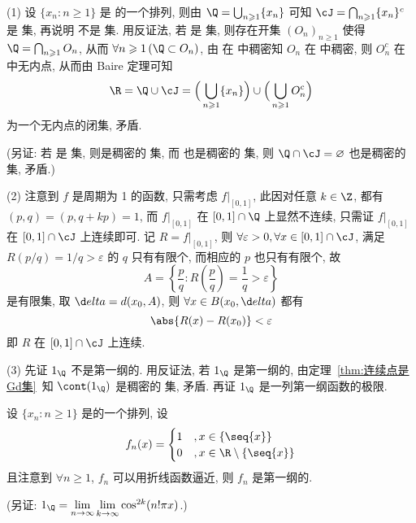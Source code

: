 	\begin{answer}
		(1) 设 $ \{ x_{n}:n\geqslant1\} $ 是 \Q 的一个排列, 则由 $ \Q=\bigcup_{n\geqslant1}\{ x_{n} \} $ 可知 $ \cJ =\bigcap_{n\geqslant1}\{ x_{n} \}^{c} $ 是 \Gd 集, 再说明 \Q 不是 \Gd 集. 用反证法, 若 \Q 是 \Gd 集, 则存在开集 $ (O_{n})_{n\geqslant1} $ 使得 $ \Q = \bigcap_{n\geqslant1}O_{n} $, 从而 $ \forall n\geqslant1\,(\Q\subset O_{n}) $, 由 \Q 在 \R 中稠密知 $ O_{n} $ 在 \R 中稠密, 则 $ O_{n}^{c} $ 在 \R 中无内点, 从而由 Baire 定理可知
		\[
			\R = \Q\cup\cJ = \Big( \bigcup_{n\geqslant1}\{ x_{n} \} \Big)\cup\Big( \bigcup_{n\geqslant1}O_{n}^{c} \Big)
		\]
		为一个无内点的闭集, 矛盾. 

		(另证: 若 \Q 是 \Gd 集, 则\Q 是稠密的 \Gd 集, 而 \cJ 也是稠密的 \Gd 集, 则 $ \Q\cap\cJ=\varnothing $ 也是稠密的 \Gd 集, 矛盾.)

		(2) 注意到 $ f $ 是周期为 1 的函数, 只需考虑 $ f|_{[0, 1]} $, 此因对任意 $ k\in\Z $, 都有 $ (p, q)=(p, q+kp)=1 $, 而 $ f|_{[0, 1]} $ 在 $ [0, 1]\cap\Q $ 上显然不连续, 只需证 $ f|_{[0, 1]} $ 在 $ [0, 1]\cap\cJ $ 上连续即可. 记 $ R = f|_{[0, 1]} $, 则 $ \forall \varepsilon>0, \forall x\in[0, 1]\cap\cJ $, 满足 $ R(p/q)=1/q>\varepsilon $ 的 $ q $ 只有有限个, 而相应的 $ p $ 也只有有限个, 故
		\[
			A=\left\{ \frac{p}{q}:R\left( \frac{p}{q} \right)=\frac{1}{q}>\varepsilon \right\}
		\]
		是有限集, 取 $ \d elta = d(x_{0}, A) $, 则 $ \forall x\in B(x_{0}, \d elta) $ 都有
		\[
			\abs{R(x)-R(x_{0})}<\varepsilon
		\]
		即 $ R $ 在 $ [0, 1]\cap\cJ $ 上连续.

		(3) 先证 $ 1_{\Q} $ 不是第一纲的. 用反证法, 若 $ 1_{\Q} $ 是第一纲的, 由定理~\ref{thm:连续点是Gd集}~知 $ \cont(1_{\Q}) $ 是稠密的 \Gd 集, 矛盾. 再证 $ 1_{\Q} $ 是一列第一纲函数的极限.

		设 $ \{ x_{n}:n\geqslant1\} $ 是\Q 的一个排列, 设
		\[
			f_{n}(x)=\begin{cases}
				1 & , x\in\{ \seq{x} \}\\
				0 & , x\in\R\setminus\{ \seq{x} \}
			\end{cases}
		\]
		且注意到 $ \forall n\geqslant1 $, $ f_{n} $ 可以用折线函数逼近, 则 $ f_{n} $ 是第一纲的.

		(另证: $ 1_{\Q}=\lim\limits_{n\to \infty}\lim\limits_{k\to\infty}\cos^{2k}(n!\pi x) $.)\qedhere
	\end{answer}	

